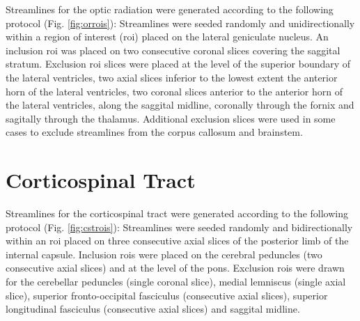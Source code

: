 Streamlines for the optic radiation were generated according to the following protocol (Fig. \ref{fig:orrois}):
Streamlines were seeded randomly and unidirectionally within a region of interest (\gls{roi}) placed on the lateral geniculate nucleus.
An inclusion \gls{roi} was placed on two consecutive coronal slices covering the saggital stratum.
Exclusion \gls{roi} slices were placed at the level of the superior boundary of the lateral ventricles, two axial slices inferior to the lowest extent the anterior horn of the lateral ventricles, two coronal slices anterior to the anterior horn of the lateral ventricles, along the saggital midline, coronally through the fornix and sagitally through the thalamus.
Additional exclusion slices were used in some cases to exclude streamlines from the corpus callosum and brainstem.



\section{Corticospinal Tract}

Streamlines for the corticospinal tract were generated according to the following protocol (Fig. \ref{fig:cstrois}):
Streamlines were seeded randomly and bidirectionally within an \gls{roi} placed on three consecutive axial slices of the posterior limb of the internal capsule.
Inclusion \glspl{roi} were placed on the cerebral peduncles (two consecutive axial slices) and at the level of the pons.
Exclusion \glspl{roi} were drawn for the cerebellar peduncles (single coronal slice), medial lemniscus (single axial slice), superior fronto-occipital fasciculus (consecutive axial slices), superior longitudinal fasciculus (consecutive axial slices) and saggital midline.







